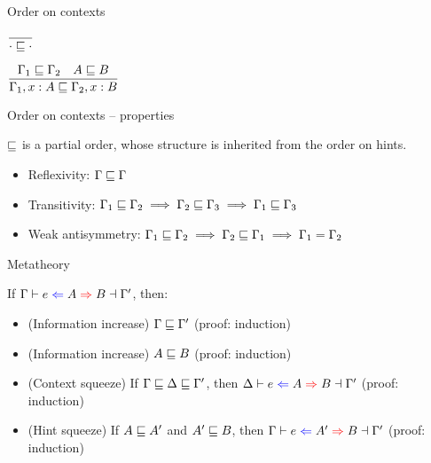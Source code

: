 \documentclass{beamer}
\begin{document}
\begin{frame}{Order on contexts}

\begin{center}
  $\displaystyle \frac{}{\cdot \sqsubseteq \cdot} \textsc{\footnotesize{}}$

  \vspace{2em}

  $\displaystyle \frac{\Gamma_1 \sqsubseteq \Gamma_2 \quad A \sqsubseteq B}{\Gamma_1, x : A \sqsubseteq \Gamma_2, x : B} \textsc{\footnotesize{}}$
\end{center}

\end{frame}

\begin{frame}{Order on contexts -- properties}

$\sqsubseteq$ is a partial order, whose structure is inherited from the order on hints.

\begin{itemize}
  \item Reflexivity: $\Gamma \sqsubseteq \Gamma$
  \item Transitivity: $\Gamma_1 \sqsubseteq \Gamma_2 \implies \Gamma_2 \sqsubseteq \Gamma_3 \implies \Gamma_1 \sqsubseteq \Gamma_3$
  \item Weak antisymmetry: $\Gamma_1 \sqsubseteq \Gamma_2 \implies \Gamma_2 \sqsubseteq \Gamma_1 \implies \Gamma_1 = \Gamma_2$
\end{itemize}

\end{frame}

\begin{frame}{Metatheory}

If $\fulloutctx{\Gamma}{e}{A}{B}{\Gamma'}$, then:

\begin{itemize}
  \item (Information increase) $\Gamma \sqsubseteq \Gamma'$ (proof: induction)
  \item (Information increase) $A \sqsubseteq B$ (proof: induction)
  \item (Context squeeze) If $\Gamma \sqsubseteq \Delta \sqsubseteq \Gamma'$, then $\fulloutctx{\Delta}{e}{A}{B}{\Gamma'}$ (proof: induction)
  \item (Hint squeeze) If $A \sqsubseteq A'$ and $A' \sqsubseteq B$, then $\fulloutctx{\Gamma}{e}{A'}{B}{\Gamma'}$ (proof: induction)
\end{itemize}

\end{frame}
\end{document}
